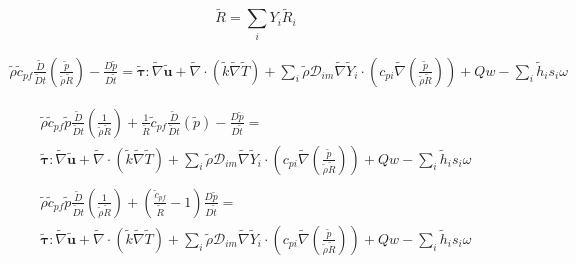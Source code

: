 \documentclass[preprint,12pt,authoryear]{elsarticle}
\begin{document}
\begin{equation}
	\tilde{R}=\sum_iY_i\tilde{R}_i
\end{equation}

\begin{equation}
\begin{split}
        \tilde{\rho}
        \tilde{c}_{pf}
        \frac{\tilde{D}}{\tilde{D} t}
        \left(
                \frac{\tilde{p}}{\tilde{\rho}\tilde{R}}
        \right)
        -
        \frac{D \tilde{p}}{D\tilde{t}}
        =
        \pmb{\tilde{\tau}}:\tilde{\nabla} \tilde{\mathbf{u}} 
        + 
        \tilde{\nabla} \cdot (\tilde{k}\tilde{\nabla} \tilde{T})
        +
        \sum\limits_i 
        \tilde{\rho}
        \mathcal{D}_{im}
        \tilde{\nabla}
        \tilde{Y}_i     
        \cdot
        \left(
                c_{pi}
                \tilde{\nabla}
                \left(
                	\frac{\tilde{p}}{\tilde{\rho}\tilde{R}}
        	\right)
        \right)
	+
	Qw
	-
        \sum\limits_i
	\tilde{h}_i
        s_i \omega	
\end{split}
\end{equation}

\begin{equation}
\begin{split}
        \tilde{\rho}
        \tilde{c}_{pf}
        \tilde{p} 
        \frac{\tilde{D}}{\tilde{D} t}
        \left(
                \frac{1}{\tilde{\rho}\tilde{R}}
        \right)
	+
        \frac{1}{\tilde{R}}
        \tilde{c}_{pf}
        \frac{\tilde{D}}{\tilde{D} t}
        \left(
                \tilde{p}
        \right)
        -
        \frac{D \tilde{p}}{D\tilde{t}}
        =
\\
        \pmb{\tilde{\tau}}:\tilde{\nabla} \tilde{\mathbf{u}} 
        + 
        \tilde{\nabla} \cdot (\tilde{k}\tilde{\nabla} \tilde{T})
        +
        \sum\limits_i 
        \tilde{\rho}
        \mathcal{D}_{im}
        \tilde{\nabla}
        \tilde{Y}_i     
        \cdot
        \left(
                c_{pi}
                \tilde{\nabla}
                \left(
                	\frac{\tilde{p}}{\tilde{\rho}\tilde{R}}
                \right)
        \right)
	+
	Qw
	-
        \sum\limits_i
	\tilde{h}_i
        s_i \omega	
\\
\\
        \tilde{\rho}
        \tilde{c}_{pf}
        \tilde{p}
        \frac{\tilde{D}}{\tilde{D} t}
        \left(
                \frac{1}{\tilde{\rho}\tilde{R}}
        \right)
	+
        \left(
        	\frac{\tilde{c}_{pf}}{\tilde{R}}
		-1
        \right)
        \frac{D \tilde{p}}{D\tilde{t}}
        =
	\\
        \pmb{\tilde{\tau}}:\tilde{\nabla} \tilde{\mathbf{u}} 
        + 
        \tilde{\nabla} \cdot (\tilde{k}\tilde{\nabla} \tilde{T})
        +
        \sum\limits_i 
        \tilde{\rho}
        \mathcal{D}_{im}
        \tilde{\nabla}
        \tilde{Y}_i     
        \cdot
        \left(
                c_{pi}
                \tilde{\nabla}
                \left(
                	\frac{\tilde{p}}{\tilde{\rho}\tilde{R}}
                \right)
        \right)
	+
	Qw
	-
        \sum\limits_i
	\tilde{h}_i
        s_i \omega	
\end{split}
\end{equation}
\end{document}
